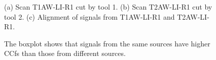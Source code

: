 \documentclass[fleqn,10pt]{wlscirep}
\begin{document}
\begin{figure}
\begin{minipage}{0.90\linewidth}
{}

\subcaption{\label{fig-T1AW-LI-R1-T2AW-LI-R1}}

\end{minipage}%

\caption{\label{fig-T1AW-LI-R1-T2AW-LI-R1-alignment}(a) Scan T1AW-LI-R1
cut by tool 1. (b) Scan T2AW-LI-R1 cut by tool 2. (c) Alignment of
signals from T1AW-LI-R1 and T2AW-LI-R1.}

\end{figure}%

\begin{figure}


\caption{\label{fig-ccf-boxplot}The boxplot shows that signals from the
same sources have higher CCfs than those from different sources.}

\end{figure}%
\end{document}
